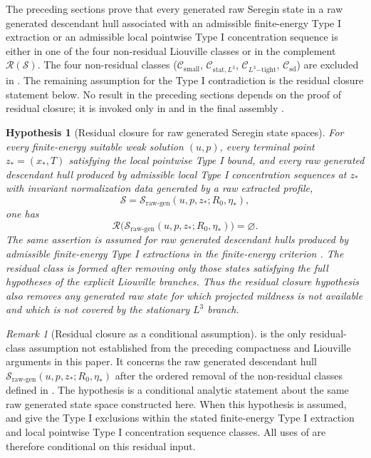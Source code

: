 \documentclass[11pt]{amsart}
\theoremstyle{plain}
\newtheorem{hypothesis}[hypothesis]{Hypothesis}
\theoremstyle{definition}
\theoremstyle{remark}
\newtheorem{remark}[remark]{Remark}
\numberwithin{equation}{section}
\newcommand{\calS}{\mathcal S}
\newcommand{\calR}{\mathcal R}
\newcommand{\calC}{\mathcal C}
\begin{document}
The preceding sections prove that every generated raw Seregin state in a raw
generated descendant hull associated with an admissible finite-energy Type I
extraction or an admissible local pointwise Type I concentration
sequence is either in one of the four non-residual Liouville classes or in the
complement \(\calR(\calS)\).  The four non-residual classes
(\(\calC_{\mathrm{small}}\), \(\calC_{\mathrm{stat},L^3}\),
\(\calC_{L^3\mathrm{-tight}}\), \(\calC_{\mathrm{sd}}\)) are excluded in
.  The remaining assumption for the Type I
contradiction is the residual closure statement below.  No result in the
preceding sections depends on the proof of residual closure; it is invoked
only in  and in the final assembly
.

\begin{hypothesis}[Residual closure for raw generated Seregin state spaces]
\label{p1:hyp:no-remainder}
For every finite-energy suitable weak solution \((u,p)\), every terminal point
\(z_*=(x_*,T)\) satisfying the local pointwise Type I bound, and every
raw generated descendant hull produced by admissible local Type I concentration
sequences at \(z_*\) with invariant normalization data generated by a raw
extracted profile,
\[
   \calS=\calS_{\mathrm{raw\text{-}gen}}(u,p,z_*;R_0,\eta_*),
\]
one has
\[
   \calR\bigl(\calS_{\mathrm{raw\text{-}gen}}(u,p,z_*;R_0,\eta_*)\bigr)=\varnothing .
\]
The same assertion is assumed for raw generated descendant hulls produced by
admissible finite-energy Type I extractions in the finite-energy criterion
.
The residual class is formed after removing only those states satisfying the
full hypotheses of the explicit Liouville branches.  Thus the residual closure
hypothesis also removes any generated raw state for which projected mildness is
not available and which is not covered by the stationary \(L^3\) branch.
\end{hypothesis}

\begin{remark}[Residual closure as a conditional assumption]
\label{p1:rem:companion-paper}
 is the only residual-class assumption not established
from the preceding compactness and Liouville arguments in this paper.  It concerns
the raw generated descendant hull
\(\calS_{\mathrm{raw\text{-}gen}}(u,p,z_*;R_0,\eta_*)\) after the ordered removal of the
non-residual classes defined in .  The hypothesis is a
conditional analytic statement about the same raw generated state space
constructed here.  When this hypothesis is assumed,
 and
 give the Type I exclusions within the stated
finite-energy Type I extraction and local pointwise Type I concentration
sequence classes.  All uses of
 are therefore conditional on this residual input.
\end{remark}
\end{document}
